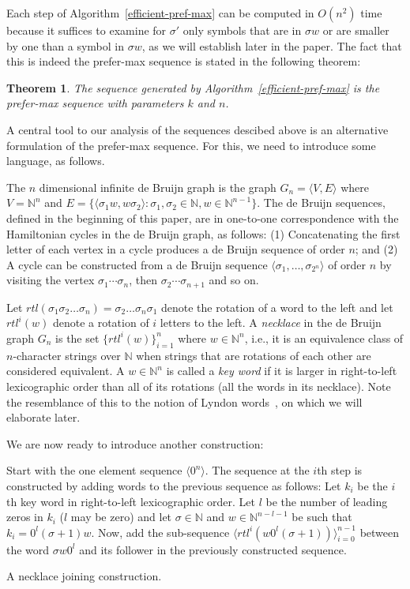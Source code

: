 \documentclass{article}
\newtheorem{theorem}{Theorem}
\theoremstyle{definition}
\newcommand{\N}{{\mathbb{N}}}
\newcommand{\T}[1]{\langle{#1}\rangle}
\begin{document}
Each step of Algorithm~\ref{efficient-pref-max} can be computed in $O(n^2)$ time because it suffices to examine for $\sigma'$ only symbols that are in $\sigma w$ or are smaller by one than a symbol in $\sigma w$, as we will establish later in the paper.
The fact that this is indeed the prefer-max sequence is stated in the following theorem:

\begin{theorem}
	The sequence generated by Algorithm~\ref{efficient-pref-max} is the prefer-max sequence with parameters $k$ and $n$.
\end{theorem}
	

A central tool to our analysis of the sequences descibed above is an alternative formulation of the prefer-max sequence. For this, we need to introduce some language, as follows.

The $n$ dimensional infinite de Bruijn graph is the graph $G_{n}=\T{V,E}$ where $V=\N^n$ and $E=\{ \T{\sigma_1 w, w \sigma_2} \colon \sigma_1,\sigma_2\in\N, w \in \N^{n-1}\}$. The de Bruijn sequences, defined in the beginning of this paper, are in one-to-one correspondence with the Hamiltonian cycles in the de Bruijn graph, as follows: (1) Concatenating the first letter of each vertex in a cycle produces a de Bruijn sequence of order $n$; and (2) A cycle can be constructed from a de Bruijn sequence $\T{\sigma_1,\dots,\sigma_{2^n}}$ of order $n$ by visiting the vertex $\sigma_1\cdots\sigma_n$, then $\sigma_2\cdots\sigma_{n+1}$ and so on.

Let $rtl(\sigma_1\sigma_2\dots\sigma_n) = \sigma_2\dots\sigma_n\sigma_1$ denote the rotation of a word to the left and let $rtl^i(w)$ denote a rotation of $i$ letters to the left. A \emph{necklace} in the de Bruijn graph $G_n$ is the set $\{rtl^i(w)\}_{i=1}^n$ where $w \in \N^n$, i.e., it is an equivalence class of $n$-character strings over $\N$ when strings that are rotations of each other are considered equivalent. A $w\in\N^n$ is called a \emph{key word} if it is larger in right-to-left lexicographic order than all of its rotations (all the words in its necklace).  Note the resemblance of this to the notion of Lyndon words~\cite{Lyndon1954}, on which we will elaborate later.

We are now ready to introduce another construction:


\begin{algorithm}[!h]
	Start with the one element sequence $\T{0^n}$. The sequence at the $i$th step is constructed by adding words to the previous sequence as follows: Let $k_i$ be the $i$th key word in right-to-left lexicographic order. Let $l$ be the number of leading zeros in $k_i$ ($l$ may be zero) and let $\sigma \in \N$ and $w\in\N^{n-l-1}$ be such that $k_i=0^l(\sigma+1)w$. Now, add the sub-sequence $\T{rtl^i(w0^l(\sigma+1))}_{i=0}^{n-1}$ between the word $\sigma w 0^l$ and its follower in the previously constructed sequence.
	\caption{A necklace joining construction.}
	\label{necklace-joining}
\end{algorithm}
\end{document}

